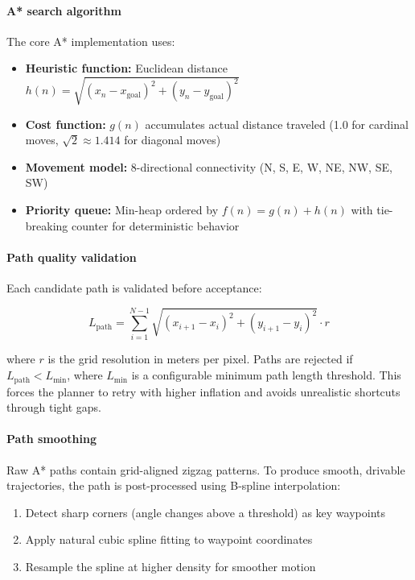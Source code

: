 \documentclass{article}
\begin{document}
\paragraph{A* search algorithm}

The core A* implementation uses:

\begin{itemize}
    \item \textbf{Heuristic function:} Euclidean distance $h(n) = \sqrt{(x_n - x_{\text{goal}})^2 + (y_n - y_{\text{goal}})^2}$
    \item \textbf{Cost function:} $g(n)$ accumulates actual distance traveled (1.0 for cardinal moves, $\sqrt{2} \approx 1.414$ for diagonal moves)
    \item \textbf{Movement model:} 8-directional connectivity (N, S, E, W, NE, NW, SE, SW)
    \item \textbf{Priority queue:} Min-heap ordered by $f(n) = g(n) + h(n)$ with tie-breaking counter for deterministic behavior
\end{itemize}

\paragraph{Path quality validation}

Each candidate path is validated before acceptance:

$$
L_{\text{path}} = \sum_{i=1}^{N-1} \sqrt{(x_{i+1} - x_i)^2 + (y_{i+1} - y_i)^2} \cdot r
$$

\noindent where $r$ is the grid resolution in meters per pixel. Paths are rejected if $L_{\text{path}} < L_{\text{min}}$, where $L_{\text{min}}$ is a configurable minimum path length threshold. This forces the planner to retry with higher inflation and avoids unrealistic shortcuts through tight gaps.

\paragraph{Path smoothing}

Raw A* paths contain grid-aligned zigzag patterns. To produce smooth, drivable trajectories, the path is post-processed using B-spline interpolation:

\begin{enumerate}
    \item Detect sharp corners (angle changes above a threshold) as key waypoints
    \item Apply natural cubic spline fitting to waypoint coordinates
    \item Resample the spline at higher density for smoother motion
\end{enumerate}
\end{document}
